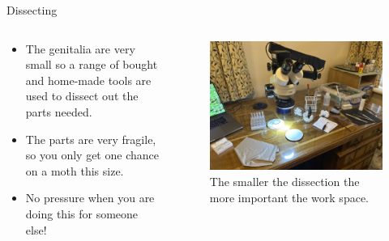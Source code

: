 \documentclass[
  ignorenonframetext,
]{beamer}
\providecommand{\tightlist}{%
  \setlength{\itemsep}{0pt}\setlength{\parskip}{0pt}}
\begin{document}
\begin{frame}{Dissecting}
\protect\hypertarget{dissecting}{}
\begin{columns}[T]
\begin{column}{0.5\textwidth}
\begin{itemize}
\tightlist
\item
  The genitalia are very small so a range of bought and home-made tools
  are used to dissect out the parts needed.
\item
  The parts are very fragile, so you only get one chance on a moth this
  size.
\item
  No pressure when you are doing this for someone else!
\end{itemize}
\end{column}

\begin{column}{0.5\textwidth}
\begin{figure}
\centering
\includegraphics{./images/dissecting.jpg}
\caption{The smaller the dissection the more important the work space.}
\end{figure}
\end{column}
\end{columns}
\end{frame}
\end{document}
